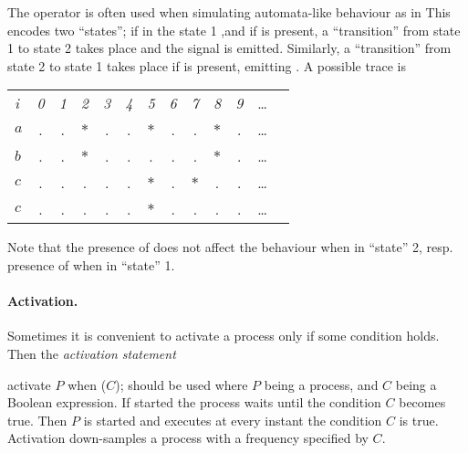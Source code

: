 The  operator is often used when simulating automata-like 
behaviour
 as in
%
%
This encodes two ``states''; if in the state 1 ,and if  is 
present, a ``transition'' from state 1 to state 2 takes place and the 
signal  is emitted.   Similarly, a ``transition'' from state 2 
to state 1 takes place if  is present, emitting . A possible trace is
\begin{center}
  \leavevmode
  \begin{tabular}[]{l@{\quad}||@{\quad} cccccccccccc}
    \hline\hline   
     \hbox{{\footnotesize \textit{i}}} &{\footnotesize \textit{0}}
     &{\footnotesize \textit{1}}&{\footnotesize \textit{2}}
     &{\footnotesize \textit{3}}&{\footnotesize \textit{4}}
     &{\footnotesize \textit{5}}&{\footnotesize \textit{6}}
     &{\footnotesize \textit{7}}&{\footnotesize \textit{8}}
     &{\footnotesize \textit{9}}&\ldots
   \\  
    \hbox{$a$} &.&.&$*$&.&.&$*$&.&.&$*$&.&\ldots
   \\
    \hbox{$b$} &.&.&$*$&.&.&.&.&.&$*$&.&\ldots
   \\
    \hbox{$c$} &.&.&.&.&.&$*$&.&$*$&.&.&\ldots
    \\   
    \hbox{$c$} &.&.&.&.&.&$*$&.&.&.&.&\ldots
    \\   
    \hline\hline
  \end{tabular}
\end{center} 
Note that the presence of  does not affect the behaviour when in ``state'' 2, resp. presence of  when in ``state'' 1.


\paragraph{Activation.} Sometimes it is convenient to activate a 
process only if some condition holds. Then the \emph{activation 
statement}

% 
\BEP
activate $P$ when ($C$);
\EEP
% 
should be used where $P$ being a process, and $C$ being a Boolean
expression.  If started the process waits until the condition $C$
becomes true.  Then $P$ is started and executes at every instant the
condition $C$ is true.  Activation down-samples a process with a
frequency specified by $C$.

